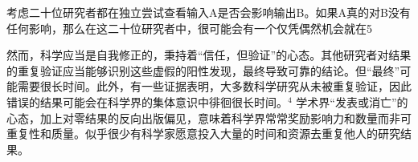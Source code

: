 考虑二十位研究者都在独立尝试查看输入A是否会影响输出B。如果A真的对B没有任何影响，那么在这二十位研究者中，很可能会有一个仅凭偶然机会就在5%

然而，科学应当是自我修正的，秉持着“信任，但验证”的心态。其他研究者对结果的重复验证应当能够识别这些虚假的阳性发现，最终导致可靠的结论。但“最终”可能需要很长时间。此外，有一些证据表明，大多数科学研究从未被重复验证，因此错误的结果可能会在科学界的集体意识中徘徊很长时间。${ }^{4}$ 学术界“发表或消亡”的心态，加上对零结果的反向出版偏见，意味着科学界常常奖励影响力和数量而非可重复性和质量。似乎很少有科学家愿意投入大量的时间和资源去重复他人的研究结果。

